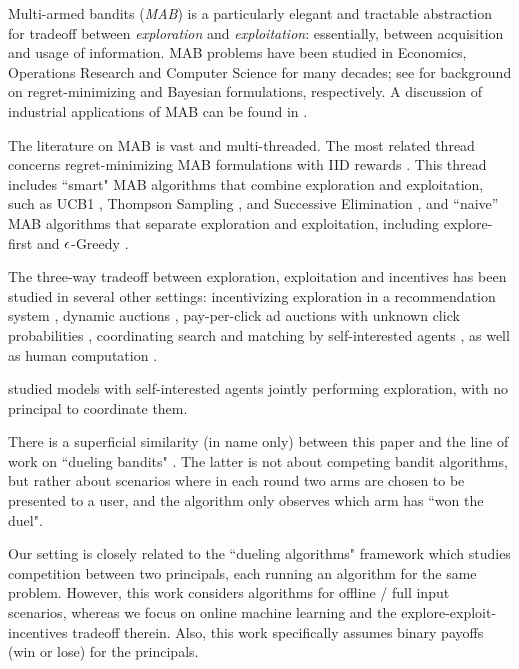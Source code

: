Multi-armed bandits (\emph{MAB}) is a particularly elegant and tractable abstraction for tradeoff between \emph{exploration} and \emph{exploitation}: essentially, between acquisition and usage of information. MAB problems have been studied in Economics, Operations Research and Computer Science for many decades; see \citep{Bubeck-survey12,Gittins-book11,slivkins-MABbook} for background on regret-minimizing and Bayesian formulations, respectively. A discussion of industrial applications of MAB can be found in \citet{MWT-WhitePaper-2016}.

The literature on MAB is vast and multi-threaded. The most related
thread concerns regret-minimizing MAB formulations with IID rewards
\citep{Lai-Robbins-85,bandits-ucb1}. This thread includes ``smart" MAB
algorithms that combine exploration and exploitation, such as UCB1
\citep{bandits-ucb1}, Thompson Sampling \citep{russo2018tutorial}, and Successive Elimination
\citep{EvenDar-icml06}, and ``naive'' MAB algorithms that separate
exploration and exploitation, including explore-first and
$\epsilon$-Greedy \citep[\eg see][]{slivkins-MABbook}.

The three-way tradeoff between exploration, exploitation and incentives has been studied in several other settings:
incentivizing exploration in a recommendation system
    \citep{Che-13,Frazier-ec14,Kremer-JPE14,ICexploration-ec15,Bimpikis-exploration-ms17,Bahar-ec16,ICexplorationGames-ec16-working},
dynamic auctions
    \cite[\eg][]{AtheySegal-econometrica13,DynPivot-econometrica10,Kakade-pivot-or13},
pay-per-click ad auctions with unknown click probabilities
    \cite[\eg][]{MechMAB-ec09,DevanurK09,Transform-ec10-jacm},
coordinating search and matching by self-interested agents
    \citep{Bobby-Glen-ec16},
as well as human computation
    \cite[\eg][]{RepeatedPA-ec14,Ghosh-itcs13,Krause-www13}.

\citet{Bolton-econometrica99,Keller-econometrica05,Johari-ec12} studied models with self-interested agents jointly performing exploration, with no principal to coordinate them.

There is a superficial similarity (in name only) between this paper and the line of work on ``dueling bandits"
    \citep[\eg][]{Yue-dueling12,Yue-dueling-icml09}.
The latter is not about competing bandit algorithms, but rather about scenarios where in each round two arms are chosen to be presented to a user, and the algorithm only observes which arm has ``won the duel".

Our setting is closely related to the ``dueling algorithms" framework \citep{DuelingAlgs-stoc11} which studies competition between two principals, each running an algorithm for the same problem. However, this work considers algorithms for offline / full input scenarios, whereas we focus on online machine learning and the explore-exploit-incentives tradeoff therein. Also, this work specifically assumes binary payoffs (\ie win or lose) for the principals.

